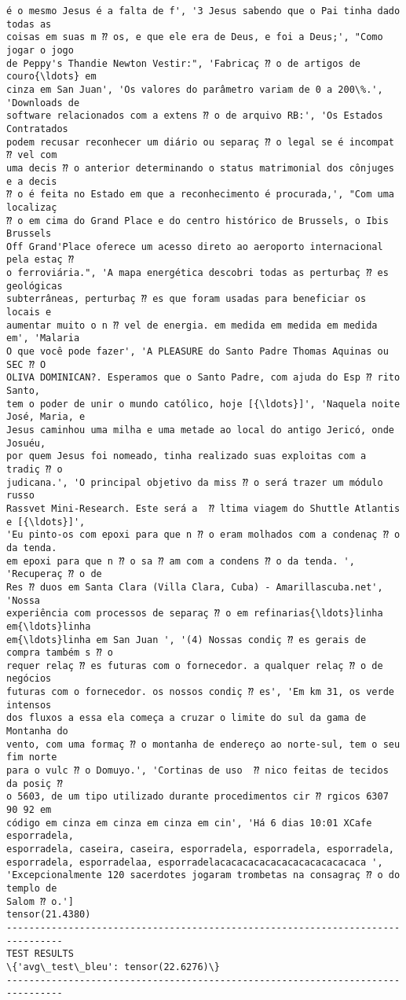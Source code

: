 \documentclass[10pt]{article}
\begin{document}
\begin{Verbatim}[commandchars=\\\{\}]
é o mesmo Jesus é a falta de f', '3 Jesus sabendo que o Pai tinha dado todas as
coisas em suas m ⁇ os, e que ele era de Deus, e foi a Deus;', "Como jogar o jogo
de Peppy's Thandie Newton Vestir:", 'Fabricaç ⁇ o de artigos de couro{\ldots} em
cinza em San Juan', 'Os valores do parâmetro variam de 0 a 200\%.', 'Downloads de
software relacionados com a extens ⁇ o de arquivo RB:', 'Os Estados Contratados
podem recusar reconhecer um diário ou separaç ⁇ o legal se é incompat ⁇ vel com
uma decis ⁇ o anterior determinando o status matrimonial dos cônjuges e a decis
⁇ o é feita no Estado em que a reconhecimento é procurada,', "Com uma localizaç
⁇ o em cima do Grand Place e do centro histórico de Brussels, o Ibis Brussels
Off Grand'Place oferece um acesso direto ao aeroporto internacional pela estaç ⁇
o ferroviária.", 'A mapa energética descobri todas as perturbaç ⁇ es geológicas
subterrâneas, perturbaç ⁇ es que foram usadas para beneficiar os locais e
aumentar muito o n ⁇ vel de energia. em medida em medida em medida em', 'Malaria
O que você pode fazer', 'A PLEASURE do Santo Padre Thomas Aquinas ou SEC ⁇ O
OLIVA DOMINICAN?. Esperamos que o Santo Padre, com ajuda do Esp ⁇ rito Santo,
tem o poder de unir o mundo católico, hoje [{\ldots}]', 'Naquela noite José, Maria, e
Jesus caminhou uma milha e uma metade ao local do antigo Jericó, onde Josuéu,
por quem Jesus foi nomeado, tinha realizado suas exploitas com a tradiç ⁇ o
judicana.', 'O principal objetivo da miss ⁇ o será trazer um módulo russo
Rassvet Mini-Research. Este será a  ⁇ ltima viagem do Shuttle Atlantis e [{\ldots}]',
'Eu pinto-os com epoxi para que n ⁇ o eram molhados com a condenaç ⁇ o da tenda.
em epoxi para que n ⁇ o sa ⁇ am com a condens ⁇ o da tenda. ', 'Recuperaç ⁇ o de
Res ⁇ duos em Santa Clara (Villa Clara, Cuba) - Amarillascuba.net', 'Nossa
experiência com processos de separaç ⁇ o em refinarias{\ldots}linha em{\ldots}linha
em{\ldots}linha em San Juan ', '(4) Nossas condiç ⁇ es gerais de compra também s ⁇ o
requer relaç ⁇ es futuras com o fornecedor. a qualquer relaç ⁇ o de negócios
futuras com o fornecedor. os nossos condiç ⁇ es', 'Em km 31, os verde intensos
dos fluxos a essa ela começa a cruzar o limite do sul da gama de Montanha do
vento, com uma formaç ⁇ o montanha de endereço ao norte-sul, tem o seu fim norte
para o vulc ⁇ o Domuyo.', 'Cortinas de uso  ⁇ nico feitas de tecidos da posiç ⁇
o 5603, de um tipo utilizado durante procedimentos cir ⁇ rgicos 6307 90 92 em
código em cinza em cinza em cinza em cin', 'Há 6 dias 10:01 XCafe esporradela,
esporradela, caseira, caseira, esporradela, esporradela, esporradela,
esporradela, esporradelaa, esporradelacacacacacacacacacacacacaca ',
'Excepcionalmente 120 sacerdotes jogaram trombetas na consagraç ⁇ o do templo de
Salom ⁇ o.']
tensor(21.4380)
--------------------------------------------------------------------------------
TEST RESULTS
\{'avg\_test\_bleu': tensor(22.6276)\}
--------------------------------------------------------------------------------

    \end{Verbatim}
\end{document}

